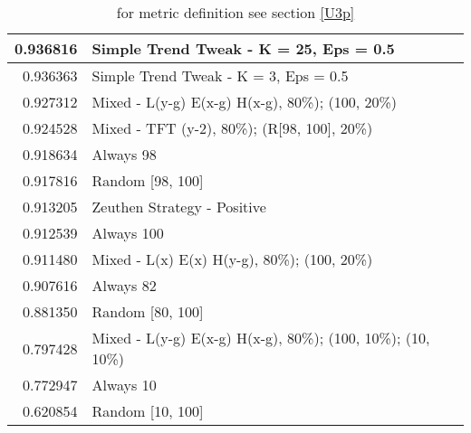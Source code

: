 \begin{table}[!hbtp]
\begin{footnotesize}
\begin{tabular}{|r|l|}
0.936816 & Simple Trend Tweak - K = 25, Eps = 0.5\\ \hline
0.936363 & Simple Trend Tweak - K = 3, Eps = 0.5\\ \hline
0.927312 & Mixed - {L(y-g) E(x-g) H(x-g), 80\%); (100, 20\%)}\\ \hline
0.924528 & Mixed - {TFT (y-2), 80\%); (R[98, 100], 20\%)}\\ \hline
0.918634 & Always 98\\ \hline
0.917816 & Random [98, 100]\\ \hline
0.913205 & Zeuthen Strategy - Positive\\ \hline
0.912539 & Always 100\\ \hline
0.911480 & Mixed - {L(x) E(x) H(y-g), 80\%); (100, 20\%)}\\ \hline
0.907616 & Always 82\\ \hline
0.881350 & Random [80, 100]\\ \hline
0.797428 & Mixed - {L(y-g) E(x-g) H(x-g), 80\%); (100, 10\%); (10, 10\%)}\\ \hline
0.772947 & Always 10\\ \hline
0.620854 & Random [10, 100]\\ \hline
\end{tabular}
\caption{for metric definition see section \eqref{U3p}}
\end{footnotesize}
\end{table}

